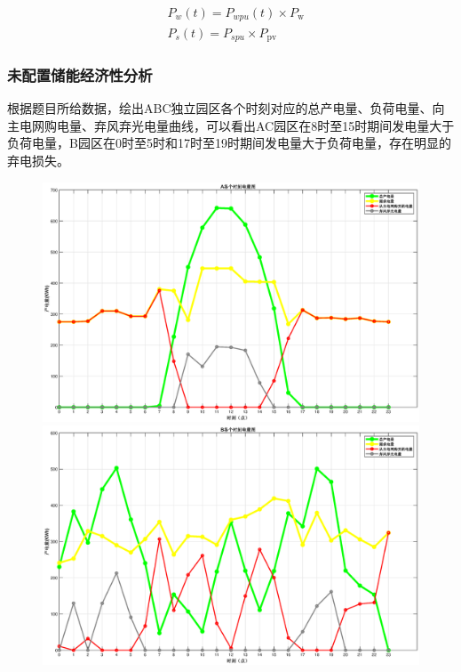 \documentclass{cumcmthesis}
\begin{document}
\begin{equation}
\begin{aligned}
& P_w(t)=P_{w p u}(t) \times P_{\mathrm{w}} \\
& P_s(t)=P_{s p u} \times P_{\mathrm{pv}}
\end{aligned}
\end{equation}

  
  \subsubsection{未配置储能经济性分析}
  根据题目所给数据，绘出ABC独立园区各个时刻对应的总产电量、负荷电量、向主电网购电量、弃风弃光电量曲线，可以看出AC园区在8时至15时期间发电量大于负荷电量，B园区在0时至5时和17时至19时期间发电量大于负荷电量，存在明显的弃电损失。
  
  \begin{figure}[!h]  
\centering  
\begin{minipage}{.5\textwidth}  
  \centering  
  \includegraphics[width=.9\linewidth]{figures/A.eps}  
\end{minipage}%
\begin{minipage}{.5\textwidth}  
  \centering  
  \includegraphics[width=.9\linewidth]{figures/B.eps}  

\end{minipage}
\end{figure}
\end{document}
